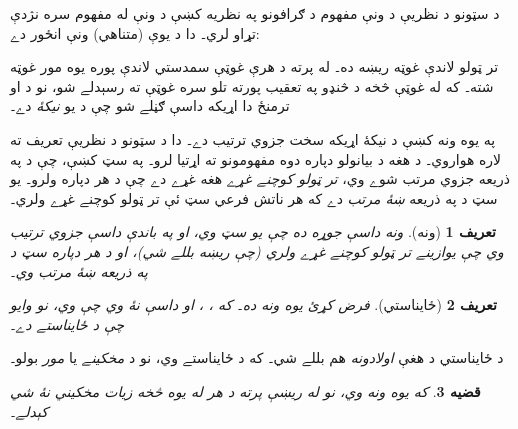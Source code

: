 \documentclass[12pt,a4paper,oneside]{report}
\newcommand{\Setabs}[2]{\{#1 : #2\}}
\newcommand{\tuple}[1]{\langle #1\rangle}
\newtheorem{defn}{تعريف}[section]
\newtheorem{prop}[defn]{قضيه}
\begin{document}
د سټونو د نظريې د ونې مفهوم د ګرافونو په نظريه کښې د ونې له
مفهوم سره نژدې تړاو لري۔ دا د يوې (متناهي) ونې انځور دے:

\begin{center}
\end{center}

تر ټولو لاندې غوټه  ريښه ده۔ له  پرته د هرې غوټې سمدستي
لاندې پوره يوه مور غوټه شته۔ که له غوټې  څخه د څنډو په تعقيب
پورته تلو سره غوټې  ته رسېدلے شو، نو د  او  ترمنځ دا
اړيکه داسې ګڼلے شو چې  د  يو \emph{نيکۀ} دے۔

په يوه ونه کښې د نيکۀ اړيکه سخت جزوي ترتيب دے۔ دا د سټونو د
نظريې تعريف ته لاره هواروي۔ د هغه د بيانولو دپاره دوه مفهومونو ته
اړتيا لرو۔ په سټ  کښې، چې د \LR{$\le$} په ذريعه جزوي مرتب شوے وي،
\emph{تر ټولو کوچنے غړے} هغه غړے  دے چې د
هر  دپاره  ولرو۔ يو سټ د \LR{$\le$} په ذريعه
\emph{ښۀ مرتب} دے که هر ناتش فرعي سټ ئې تر ټولو کوچنے غړے ولري۔

\begin{defn}[ونه]
\emph{ونه} داسې جوړه \LR{$T = \tuple{A, \le}$} ده چې  يو سټ وي،
او \LR{$\le$} په  باندې داسې جزوي ترتيب وي چې يوازينے تر ټولو
کوچنے غړے  ولري (چې \emph{ريښه} بللے شي)، او د هر
 دپاره سټ \LR{$\Setabs{y}{y \le x}$} د \LR{$\le$} په ذريعه
ښۀ مرتب وي۔
\end{defn}

\begin{defn}[ځايناستي]
فرض کړئ \LR{$T = \tuple{A, \le}$} يوه ونه ده۔ که ،
، او داسې  نۀ وي چې  وي، نو وايو
چې  د  \emph{ځايناستے} دے۔
\end{defn}

د  ځايناستي د هغې \emph{اولادونه} هم بللے شي۔ که 
د  ځايناستے وي، نو  د  \emph{مخکينے} يا \emph{مور}
بولو۔

\begin{prop}
که \LR{$\tuple{A,\le}$} يوه ونه وي، نو له ريښې پرته د هر 
له يوه څخه زيات مخکيني نۀ شي کېدلے۔
\end{prop}
\end{document}
